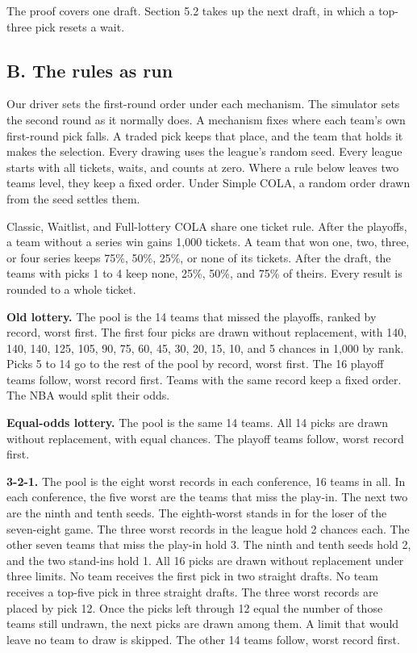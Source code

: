 \documentclass[11pt,letterpaper]{article}
\begin{document}
The proof covers one draft. Section 5.2 takes up the next draft, in which a top-three pick resets a wait.

\subsection*{B. The rules as run}

Our driver sets the first-round order under each mechanism. The simulator sets the second round as it normally does. A mechanism fixes where each team's own first-round pick falls. A traded pick keeps that place, and the team that holds it makes the selection. Every drawing uses the league's random seed. Every league starts with all tickets, waits, and counts at zero. Where a rule below leaves two teams level, they keep a fixed order. Under Simple COLA, a random order drawn from the seed settles them.

Classic, Waitlist, and Full-lottery COLA share one ticket rule. After the playoffs, a team without a series win gains 1,000 tickets. A team that won one, two, three, or four series keeps 75\%, 50\%, 25\%, or none of its tickets. After the draft, the teams with picks 1 to 4 keep none, 25\%, 50\%, and 75\% of theirs. Every result is rounded to a whole ticket.

\textbf{Old lottery.} The pool is the 14 teams that missed the playoffs, ranked by record, worst first. The first four picks are drawn without replacement, with 140, 140, 140, 125, 105, 90, 75, 60, 45, 30, 20, 15, 10, and 5 chances in 1,000 by rank. Picks 5 to 14 go to the rest of the pool by record, worst first. The 16 playoff teams follow, worst record first. Teams with the same record keep a fixed order. The NBA would split their odds.

\textbf{Equal-odds lottery.} The pool is the same 14 teams. All 14 picks are drawn without replacement, with equal chances. The playoff teams follow, worst record first.

\textbf{3-2-1.} The pool is the eight worst records in each conference, 16 teams in all. In each conference, the five worst are the teams that miss the play-in. The next two are the ninth and tenth seeds. The eighth-worst stands in for the loser of the seven-eight game. The three worst records in the league hold 2 chances each. The other seven teams that miss the play-in hold 3. The ninth and tenth seeds hold 2, and the two stand-ins hold 1. All 16 picks are drawn without replacement under three limits. No team receives the first pick in two straight drafts. No team receives a top-five pick in three straight drafts. The three worst records are placed by pick 12. Once the picks left through 12 equal the number of those teams still undrawn, the next picks are drawn among them. A limit that would leave no team to draw is skipped. The other 14 teams follow, worst record first.
\end{document}
